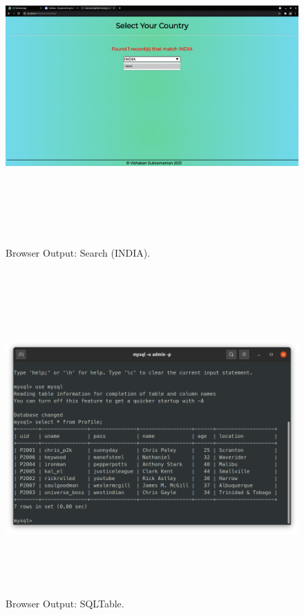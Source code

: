 \documentclass[12pt, a4]{article}
\begin{document}
\newpage
\subsection*{}
\begin{figure}[h]
\centering
\caption{Browser Output: Search (INDIA).}
\includegraphics[height=12cm, width=18cm]{Output/Autocomplete4.png}
\end{figure}

\newpage
\subsection*{}
\begin{figure}[h]
\centering
\caption{Browser Output: SQLTable.}
\includegraphics[height=12cm, width=18cm]{Output/SQLTable.png}
\end{figure}
\end{document}
